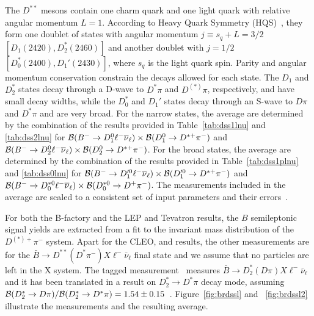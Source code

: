 \label{slbdecays_dsslnu}

The $D^{**}$ mesons contain one charm quark and one light quark with relative angular momentum $L=1$. According to Heavy Quark Symmetry (HQS)~\cite{Isgur:1991wq}, they form one doublet of states with angular momentum $j \equiv s_q + L= 3/2$  $\left[D_1(2420), D_2^*(2460)\right]$ and another doublet with $j=1/2$ $\left[D^*_0(2400), D_1'(2430)\right]$, where $s_q$ is the light quark spin. Parity and angular momentum conservation constrain the decays allowed for each state. The $D_1$ and $D_2^*$ states decay through a D-wave to $D^*\pi$ and $D^{(*)}\pi$, respectively, and have small decay widths, while the $D_0^*$ and $D_1'$  states decay through an S-wave to $D\pi$ and $D^*\pi$ and are very broad.
For the narrow states, the average  are determined by the
combination of the results provided in Table~\ref{tab:dss1lnu} and \ref{tab:dss2lnu} for 
$\cbf(B^- \to D_1^0\ell^-\bar{\nu}_{\ell})
\times \cbf(D_1^0 \to D^{*+}\pi^-)$ and $\cbf(B^- \to D_2^0\ell^-\bar{\nu}_{\ell})
\times \cbf(D_2^0 \to D^{*+}\pi^-)$. 
For the broad states, the average are determined by the
combination of the results provided in Table~\ref{tab:dss1plnu} and \ref{tab:dss0lnu} for 
$\cbf(B^- \to D_1'^0\ell^-\bar{\nu}_{\ell})
\times \cbf(D_1'^0 \to D^{*+}\pi^-)$ and $\cbf(B^- \to D_0^{*0}\ell^-\bar{\nu}_{\ell})
\times \cbf(D_0^{*0} \to D^{+}\pi^-)$. 
The measurements included in the average are scaled to a consistent set of input
parameters and their errors~\cite{HFAG_sl:inputparams}.  

For both the B-factory and the LEP and Tevatron results, the $B$ semileptonic 
signal yields are extracted from a fit to the invariant mass distribution of the $D^{(*)+}\pi^-$ system.
 Apart for the CLEO, \belle and \babar results, the other measurements 
 are for the $\bar{B} \to D^{**}(D^*\pi^-)X \ell^- \bar{\nu}_{\ell}$ final state and 
 we assume that no particles are left in the X system. The \babar tagged measurement~\cite{Aubert:2009_4} measures 
 $\bar{B} \to D_2^*(D\pi)X \ell^- \bar{\nu}_{\ell}$ and it has been translated in 
 a result on  $D_2^*\to D^*\pi$ decay mode, assuming 
 ${\cal B}(D_2^*\to D\pi)/{\cal B}(D_2^*\to D^*\pi)=1.54\pm 0.15$~\cite{PDG_2014}. 
Figure~\ref{fig:brdssl} and ~\ref{fig:brdssl2} illustrate the measurements and the
resulting average.






